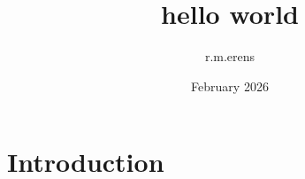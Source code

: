 \documentclass{article}
\title{hello world}
\author{r.m.erens }
\date{February 2026}
\begin{document}
\maketitle

\section{Introduction}
\end{document}
